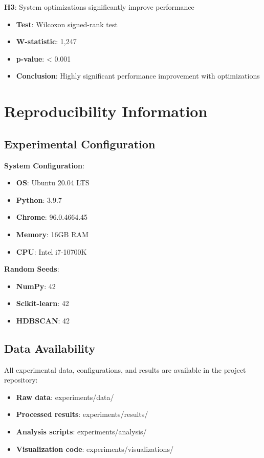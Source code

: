 \textbf{H3}: System optimizations significantly improve performance
\begin{itemize}
    \item \textbf{Test}: Wilcoxon signed-rank test
    \item \textbf{W-statistic}: 1,247
    \item \textbf{p-value}: < 0.001
    \item \textbf{Conclusion}: Highly significant performance improvement with optimizations
\end{itemize}

\section{Reproducibility Information}
\label{sec:reproducibility}

\subsection{Experimental Configuration}
\label{subsec:experimental-config}

\textbf{System Configuration}:
\begin{itemize}
    \item \textbf{OS}: Ubuntu 20.04 LTS
    \item \textbf{Python}: 3.9.7
    \item \textbf{Chrome}: 96.0.4664.45
    \item \textbf{Memory}: 16GB RAM
    \item \textbf{CPU}: Intel i7-10700K
\end{itemize}

\textbf{Random Seeds}:
\begin{itemize}
    \item \textbf{NumPy}: 42
    \item \textbf{Scikit-learn}: 42
    \item \textbf{HDBSCAN}: 42
\end{itemize}

\subsection{Data Availability}
\label{subsec:data-availability}

All experimental data, configurations, and results are available in the project repository:
\begin{itemize}
    \item \textbf{Raw data}: experiments/data/
    \item \textbf{Processed results}: experiments/results/
    \item \textbf{Analysis scripts}: experiments/analysis/
    \item \textbf{Visualization code}: experiments/visualizations/
\end{itemize} 